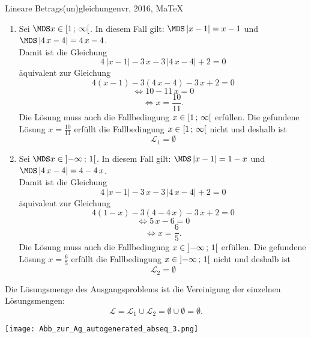 \begin{MAufgabe}{Lineare Betrags(un)gleichungen}{vr, 2016, MaTeX}
 \begin{enumerate} 
 \item Sei $ \MDS x\in[ 1 \, \MIntvlSep \, \infty\MoIr $. 
 In diesem Fall gilt: 
  $ \MDS \left| x - 1\right|=x - 1$ und $ \MDS \left| 4\, x - 4\right|=4\, x - 4$. \\ 
 Damit ist die Gleichung 
 $$ 
4\, \left|x - 1\right| - 3\, x - 3\, \left|4\, x - 4\right| + 2= 0
$$
 \"aquivalent zur Gleichung
 $$ 
4\left(x - 1\right)-3\left( 4\, x - 4\right)- 3\, x+2= 0 
$$  
$$ 
 \Leftrightarrow 10 - 11\, x= 0 
$$  
$$ \Leftrightarrow x = \frac{10}{11} . 
 $$ 
 Die L\"osung muss auch die Fallbedingung $x\in [ 1 \, ; \, \infty[\mbox{}  $ erf\"ullen. Die gefundene L\"osung $x=\frac{10}{11}$ erf\"ullt die Fallbedingung  $x\in [ 1 \, ; \, \infty[\mbox{} $ nicht und deshalb ist  $$
 \mathcal{L}_{1}=\emptyset 
 $$ 
\item Sei $ \MDS x\in\MoIl  -\infty \, \MIntvlSep \, 1\MoIr $. 
 In diesem Fall gilt: 
  $ \MDS \left| x - 1\right|=1 - x$ und $ \MDS \left| 4\, x - 4\right|=4 - 4\, x$. \\ 
 Damit ist die Gleichung 
 $$ 
4\, \left|x - 1\right| - 3\, x - 3\, \left|4\, x - 4\right| + 2= 0
$$
 \"aquivalent zur Gleichung
 $$ 
4\left(1 - x\right)-3\left( 4 - 4\, x\right)- 3\, x+2= 0 
$$  
$$ 
 \Leftrightarrow 5\, x - 6= 0 
$$  
$$ \Leftrightarrow x = \frac{6}{5} . 
 $$ 
 Die L\"osung muss auch die Fallbedingung $x\in \mbox{}]\mathopen{}  -\infty \, ; \, 1[\mbox{}  $ erf\"ullen. Die gefundene L\"osung $x=\frac{6}{5}$ erf\"ullt die Fallbedingung  $x\in \mbox{}]\mathopen{}  -\infty \, ; \, 1[\mbox{} $ nicht und deshalb ist  $$
 \mathcal{L}_{2}=\emptyset 
 $$ 
 \end{enumerate} 
  Die L\"osungsmenge des Ausgangsproblems ist die Vereinigung der einzelnen L\"osungsmengen: 
$$ \mathcal{L} = \mathcal{L}_{1} \cup \mathcal{L}_{2} 
 = \emptyset\cup \emptyset 
   =\emptyset 
   . $$ 
 
 \begin{center}
 \texttt{[image: Abb\_zur\_Ag\_autogenerated\_abseq\_3.png]} \end{center}
 
\else\relax\fi
 \end{MAufgabe}
